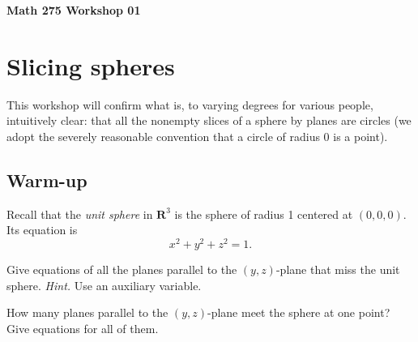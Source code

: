 \documentclass[12pt]{exam}
\begin{document}
\noindent
\textbf{{\large Math 275 \hfill Workshop 01}}

\noindent
{} 

\noindent
{} 

\noindent

\section{Slicing spheres}

This workshop will confirm what is, to varying degrees for various
people, intuitively clear: that all the nonempty slices of a sphere by
planes are circles (we adopt the severely reasonable convention that a
circle of radius 0 is a point).

\subsection{Warm-up}

Recall that the \emph{unit sphere} in $\mathbf{R}^3$ is the sphere of
radius 1 centered at $(0,0,0)$. Its equation is
\[ x^2 + y^2 + z^2 = 1. \]

\begin{questions}

\question Give equations of all the planes parallel to the $(y,z)$-plane that miss the unit sphere. \emph{Hint.} Use an auxiliary variable.


\question How many planes parallel to the $(y,z)$-plane meet the sphere at one point? Give equations for all of them.

 
\end{questions}


\end{document}
